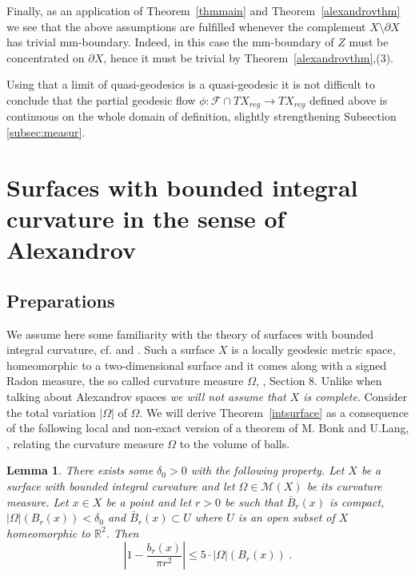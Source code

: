 \documentclass[12pt,leqno]{amsart}
\numberwithin{equation}{section}
\newtheorem{lem}[thm]{Lemma}
\theoremstyle{definition}
\theoremstyle{remark}
\newcommand{\tref}[1]{Theorem~\ref{#1}}
\newcommand{\R}{\mathbb{R}}
\begin{document}
Finally, as an application of \tref{thmmain} and \tref{alexandrovthm} we see that the above assumptions are fulfilled whenever the complement $X\setminus \partial X$ has trivial mm-boundary. Indeed, in this case the mm-boundary of $Z$ must be concentrated on $\partial X$, hence it must be trivial by \tref{alexandrovthm},(3).

Using that a limit of quasi-geodesics is a quasi-geodesic it is not difficult to conclude that the partial geodesic flow $\phi:\mathcal F\cap TX_{reg} \to TX_{reg}$ defined above is continuous on the whole domain of definition, slightly strengthening Subsection \ref{subsec:measur}.



\section{Surfaces with bounded integral curvature in the sense of Alexandrov} \label{sec:surface}
\subsection{Preparations} We assume here some  familiarity  with the theory of surfaces with bounded integral curvature, cf. \cite{AZ} and
 \cite{Reshetnyak-GeomIV}.  Such a surface $X$ is a locally geodesic metric space, homeomorphic to a two-dimensional surface and it comes along with a
signed Radon measure, the so called curvature measure $\Omega$, \cite{Reshetnyak-GeomIV}, Section 8. Unlike when talking about Alexandrov spaces \emph{we will not assume that $X$ is complete}.
 Consider the total variation $|\Omega |$ of $\Omega$.
 We will derive  \tref{intsurface} as a consequence of the following local and non-exact version of a theorem of M. Bonk and U.Lang, \cite{Bonk-Lang}, relating the curvature measure $\Omega$ to the volume of balls.

\begin{lem} \label{lem:bl}
There exists some $\delta _0>0$ with the following property.
Let $X$ be a surface with bounded integral curvature and let  $\Omega\in \mathcal M(X)$ be its   curvature measure. Let $x\in X$ be a point and let $r>0$ be such that
$\bar B_{r} (x)$ is compact,  $| \Omega| ( B_{r} (x) )  < \delta _0$ and $\bar B_{r} (x)\subset U$ where $U$ is an open subset of $X$ homeomorphic to $\R^2$.
Then $$|1- \frac {b_r(x)}  {\pi r^2} | \leq 5 \cdot |\Omega |( B_{r} (x)) \; .$$
\end{lem}
\end{document}
